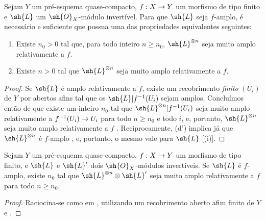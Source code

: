\documentclass[oneside,10pt]{amsart}
\makeatletter
\renewcommand{\geq}{\geqslant}
\newcommand{\ega@arrow}[2]{\mathchoice{#1}{#2}{#2}{#2}}
\renewcommand{\to}{\ega@arrow{\longrightarrow}{\rightarrow}}
\let\EGAOriginalLabel\label
\renewcommand{\label}[1]{\phantomsection\EGAOriginalLabel{#1}}
\makeatother
\begin{document}
\begin{proposition}[4.6.11]
\label{II.4.6.11}
Sejam $Y$ um pré-esquema quase-compacto, $f:X\to Y$ um morfismo de tipo finito e $\sh{L}$ um $\sh{O}_X$-módulo invertível.
Para que $\sh{L}$ seja $f$-amplo, é necessário e suficiente que possua uma das propriedades equivalentes seguintes:
\begin{enumerate}
  \item[\rm{(d)}] Existe $n_0>0$ tal que, para todo inteiro $n\geq n_0$, $\sh{L}^{\otimes n}$ seja muito amplo relativamente a $f$.
  \item[\rm{(d')}] Existe $n>0$ tal que $\sh{L}^{\otimes n}$ seja muito amplo relativamente a $f$.
\end{enumerate}
\end{proposition}

\begin{proof}
Se $\sh{L}$ é amplo relativamente a $f$, existe um recobrimento \emph{finito} $(U_i)$ de $Y$ por abertos afins tal que os $\sh{L}|f^{-1}(U_i)$ sejam amplos.
Concluímos então de  que existe um inteiro $n_0$ tal que $\sh{L}^{\otimes n}|f^{-1}(U_i)$ seja muito amplo relativamente a $f^{-1}(U_i)\to U_i$ para todo $n\geq n_0$ e todo $i$, e, portanto, $\sh{L}^{\otimes n}$ seja muito amplo relativamente a $f$ .
Reciprocamente, (d') implica já que $\sh{L}^{\otimes n}$ é $f$-amplo , e, portanto, o mesmo vale para $\sh{L}$ [(i)].
\end{proof}

\begin{corollary}[4.6.12]
\label{II.4.6.12}
Sejam $Y$ um pré-esquema quase-compacto, $f:X\to Y$ um morfismo de tipo finito, e $\sh{L}$ e $\sh{L}'$ dois $\sh{O}_X$-módulos invertíveis.
Se $\sh{L}$ é $f$-amplo, existe $n_0$ tal que $\sh{L}^{\otimes n}\otimes\sh{L}'$ seja muito amplo relativamente a $f$ para todo $n\geq n_0$.
\end{corollary}

\begin{proof}
Raciocina-se como em , utilizando um recobrimento aberto afim finito de $Y$ e .
\end{proof}
\end{document}
